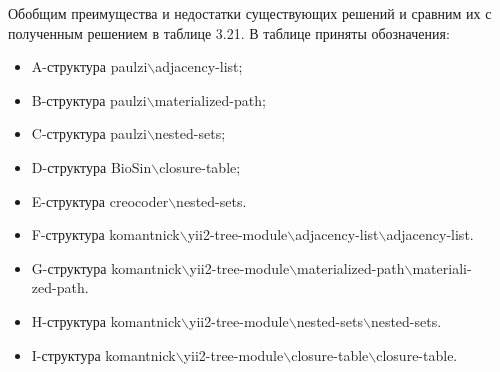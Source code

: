 \documentclass[a4paper,14pt]{extreport}
\theoremstyle{definition}
\begin{document}
Обобщим преимущества и недостатки существующих решений и сравним их с полученным решением в таблице 3.21.
В таблице приняты обозначения:
\begin{itemize}
\item A-структура paulzi$\backslash$adjacency-list;
\item B-структура paulzi$\backslash$materialized-path;
\item C-структура paulzi$\backslash$nested-sets;
\item D-структура BioSin$\backslash$closure-table;
\item E-структура creocoder$\backslash$nested-sets.
\item F-структура komantnick$\backslash$yii2-tree-module$\backslash$adjacency-list$\backslash$adjacency-list.
\item G-структура komantnick$\backslash$yii2-tree-module$\backslash$materialized-path$\backslash$materiali-\\zed-path.
\item H-структура komantnick$\backslash$yii2-tree-module$\backslash$nested-sets$\backslash$nested-sets.
\item I-структура komantnick$\backslash$yii2-tree-module$\backslash$closure-table$\backslash$closure-table.
\end{itemize}
\end{document}
